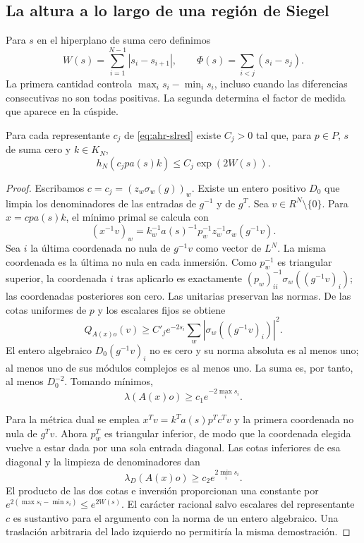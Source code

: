 \subsection{La altura a lo largo de una región de Siegel}

Para $s$ en el hiperplano de suma cero definimos
\begin{equation}
 W(s)=\sum_{i=1}^{N-1}|s_i-s_{i+1}|,\qquad
 \Phi(s)=\sum_{i<j}(s_i-s_j).
 \label{eq:ahr-WPhi}
\end{equation}
La primera cantidad controla $\max_i s_i-\min_i s_i$, incluso cuando las diferencias consecutivas no son todas positivas. La segunda determina el factor de medida que aparece en la cúspide.

\begin{proposicion}
\label{prop:ahr-cuspht}
Para cada representante $c_j$ de \eqref{eq:ahr-slred} existe $C_j>0$ tal que, para $p\in P$, $s$ de suma cero y $k\in K_N$,
\begin{equation}
 h_N(c_j p a(s)k)\le C_j\exp(2W(s)).
 \label{eq:ahr-cuspht}
\end{equation}
\end{proposicion}
\begin{proof}
Escribamos $c=c_j=(z_w\sigma_w(g))_w$. Existe un entero positivo $D_0$ que limpia los denominadores de las entradas de $g^{-1}$ y de $g^T$. Sea $v\in R^N\setminus\{0\}$. Para $x=cpa(s)k$, el mínimo primal se calcula con
\[
 (x^{-1}v)_w=k_w^{-1}a(s)^{-1}p_w^{-1}z_w^{-1}\sigma_w(g^{-1}v).
\]
Sea $i$ la última coordenada no nula de $g^{-1}v$ como vector de $L^N$. La misma coordenada es la última no nula en cada inmersión. Como $p_w^{-1}$ es triangular superior, la coordenada $i$ tras aplicarlo es exactamente $(p_w)_{ii}^{-1}\sigma_w((g^{-1}v)_i)$; las coordenadas posteriores son cero. Las unitarias preservan las normas. De las cotas uniformes de $p$ y los escalares fijos se obtiene
\[
 Q_{A(x)o}(v)\ge C'_j e^{-2s_i}\sum_w|\sigma_w((g^{-1}v)_i)|^2.
\]
El entero algebraico $D_0(g^{-1}v)_i$ no es cero y su norma absoluta es al menos uno; al menos uno de sus módulos complejos es al menos uno. La suma es, por tanto, al menos $D_0^{-2}$. Tomando mínimos,
\[
 \lambda(A(x)o)\ge c_1 e^{-2\max_i s_i}.
\]

Para la métrica dual se emplea $x^Tv=k^Ta(s)p^Tc^Tv$ y la primera coordenada no nula de $g^Tv$. Ahora $p_w^T$ es triangular inferior, de modo que la coordenada elegida vuelve a estar dada por una sola entrada diagonal. Las cotas inferiores de esa diagonal y la limpieza de denominadores dan
\[
 \lambda_D(A(x)o)\ge c_2 e^{2\min_i s_i}.
\]
El producto de las dos cotas e inversión proporcionan una constante por $e^{2(\max s_i-\min s_i)}\le e^{2W(s)}$. El carácter racional salvo escalares del representante $c$ es sustantivo para el argumento con la norma de un entero algebraico. Una traslación arbitraria del lado izquierdo no permitiría la misma demostración.
\end{proof}


